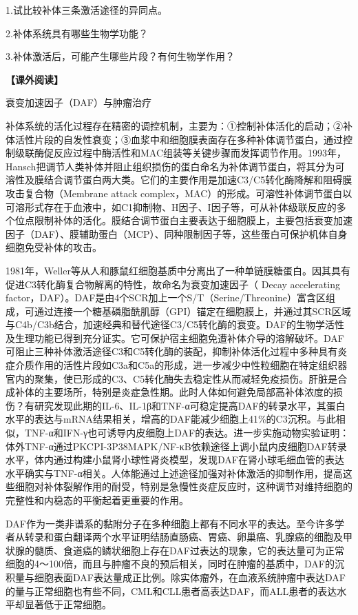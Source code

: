 1.试比较补体三条激活途径的异同点。

2.补体系统具有哪些生物学功能？

3.补体激活后，可能产生哪些片段？有何生物学作用？

\noindent\textbf{【课外阅读】}

\begin{center}
    {\Large 衰变加速因子（DAF）与肿瘤治疗}
\end{center}

补体系统的活化过程存在精密的调控机制，主要为：①控制补体活化的启动；②补体活性片段的自发性衰变；③血浆中和细胞膜表面存在多种补体调节蛋白，通过控制级联酶促反应过程中酶活性和MAC组装等关键步骤而发挥调节作用。1993年，Hansch把调节人类补体并阻止组织损伤的蛋白命名为补体调节蛋白，将其分为可溶性及膜结合调节蛋白两大类。它们的主要作用是加速C3/C5转化酶降解和阻碍膜攻击复合物（Membrane
attack
complex，MAC）的形成。可溶性补体调节蛋白以可溶形式存在于血液中，如C1抑制物、H因子、I因子等，可从补体级联反应的多个位点限制补体的活化。膜结合调节蛋白主要表达于细胞膜上，主要包括衰变加速因子（DAF）、膜辅助蛋白（MCP）、同种限制因子等，这些蛋白可保护机体自身细胞免受补体的攻击。

1981年，Weller等从人和豚鼠红细胞基质中分离出了一种单链膜糖蛋白。因其具有促进C3转化酶复合物解离的特性，故命名为衰变加速因子（
Decay accelerating
factor，DAF）。DAF是由4个SCR加上一个S/T（Serine/Threonine）富含区组成，可通过连接一个糖基磷脂酰肌醇（GPI）锚定在细胞膜上，并通过其SCR区域与C4b/C3b结合，加速经典和替代途径C3/C5转化酶的衰变。DAF的生物学活性及生理功能已得到充分证实。它可保护宿主细胞免遭补体介导的溶解破坏。DAF可阻止三种补体激活途径C3和C5转化酶的装配，抑制补体活化过程中多种具有炎症介质作用的活性片段如C3a和C5a的形成，进一步减少中性粒细胞在特定组织器官内的聚集，使已形成的C3、C5转化酶失去稳定性从而减轻免疫损伤。肝脏是合成补体的主要场所，特别是炎症急性期。此时人体如何避免局部高补体浓度的损伤？有研究发现此期的IL-6、IL-1β和TNF-α可稳定提高DAF的转录水平，其蛋白水平的表达与mRNA结果相关，增高的DAF能减少细胞上41\%的C3沉积。与此相似，TNF-α和IFN-γ也可诱导内皮细胞上DAF的表达。进一步实施动物实验证明：体外TNF-α通过PKCPI-3P38MAPK/NF-κB依赖途径上调小鼠内皮细胞DAF转录水平，体内通过构建小鼠肾小球性肾炎模型，发现DAF在肾小球毛细血管的表达水平确实与TNF-α相关。人体能通过上述途径加强对补体激活的抑制作用，提高这些细胞对补体裂解作用的耐受，特别是急慢性炎症反应时，这种调节对维持细胞的完整性和内稳态的平衡起着更重要的作用。

DAF作为一类非谱系的黏附分子在多种细胞上都有不同水平的表达。至今许多学者从转录和蛋白翻译两个水平证明结肠直肠癌、胃癌、卵巢癌、乳腺癌的细胞及甲状腺的髓质、食道癌的鳞状细胞上存在DAF过表达的现象，它的表达量可为正常细胞的4～100倍，而且与肿瘤不良的预后相关，同时在肿瘤的基质中，DAF的沉积量与细胞表面DAF表达量成正比例。除实体瘤外，在血液系统肿瘤中表达DAF的量与正常细胞也有些不同，CML和CLL患者高表达DAF，而ALL患者的表达水平却显著低于正常细胞。

